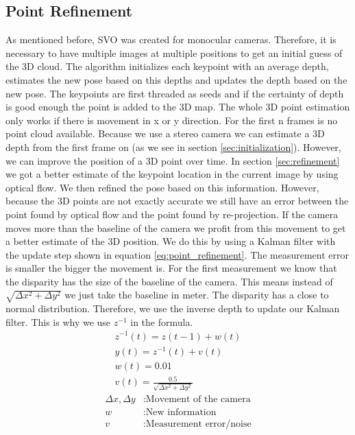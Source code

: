 \documentclass[11pt,a4paper,titlepage,oneside]{report}
\begin{document}
\subsection{Point Refinement}
As mentioned before, SVO \cite{svo} was created for monocular cameras. Therefore, it is necessary to have multiple images at multiple positions to get an initial guess of the 3D cloud. The algorithm initializes each keypoint with an average depth, estimates the new pose based on this depths and updates the depth based on the new pose. The keypoints are first threaded as seeds and if the certainty of depth is good enough the point is added to the 3D map. The whole 3D point estimation only works if there is movement in x or y direction. For the first n frames is no point cloud available. Because we use a stereo camera we can estimate a 3D depth from the first frame on (as we see in section \ref{sec:initialization}). However, we can improve the position of a 3D point over time. In section \ref{sec:refinement} we got a better estimate of the keypoint location in the current image by using optical flow. We then refined the pose based on this information. However, because the 3D points are not exactly accurate we still have an error between the point found by optical flow and the point found by re-projection. If the camera moves more than the baseline of the camera we profit from this movement to get a better estimate of the 3D position. We do this by using a Kalman filter with the update step shown in equation \ref{eq:point_refinement}. The measurement error is smaller the bigger the movement is. For the first measurement we know that the disparity has the size of the baseline of the camera. This means instead of $\sqrt{\Delta x^2+\Delta y^2}$ we just take the baseline in meter. The disparity has a close to normal distribution. Therefore, we use the inverse depth to update our Kalman filter. This is why we use $z^{-1}$ in the formula.
\begin{equation}\label{eq:point_refinement}
  \begin{gathered}
    z^{-1}(t)=z(t-1)+w(t)\\
    y(t)=z^{-1}(t)+v(t)\\
    w(t)=0.01\\
    v(t)=\frac{0.5}{\sqrt{\Delta x^2 + \Delta y^2}}
  \end{gathered}
\end{equation}
\begin{align*}
  \Delta x, \Delta y  &: \text{Movement of the camera}\\
  w                   &: \text{New information}\\
  v                   &: \text{Measurement error/noise}\\
\end{align*}
\end{document}
